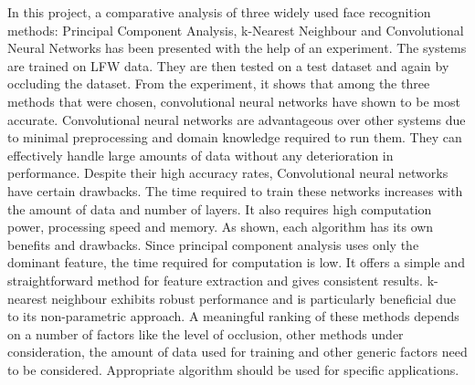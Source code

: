 \documentclass[conference]{IEEEtran}
\begin{document}
In this project, a comparative analysis of three widely used face recognition methods: Principal Component Analysis, k-Nearest Neighbour and Convolutional Neural Networks has been presented with the help of an experiment. The systems are trained on LFW data. They are then tested on a test dataset and again by occluding the dataset. From the experiment, it shows that among the three methods that were chosen, convolutional neural networks have shown to be most accurate. Convolutional neural networks are advantageous over other systems due to minimal preprocessing and domain knowledge required to run them. They can effectively handle large amounts of data without any deterioration in performance. Despite their high accuracy rates, Convolutional neural networks have certain drawbacks. The time required to train these networks increases with the amount of data and number of layers. It also requires high computation power, processing speed and memory. As shown, each algorithm has its own benefits and drawbacks. Since principal component analysis uses only the dominant feature, the time required for computation is low. It offers a simple and straightforward method for feature extraction and gives consistent results. k-nearest neighbour exhibits robust performance and is particularly beneficial due to its non-parametric approach. A meaningful ranking of these methods depends on a number of factors like the level of occlusion, other methods under consideration, the amount of data used for training and other generic factors need to be considered. Appropriate algorithm should be used for specific applications. 
\end{document}
